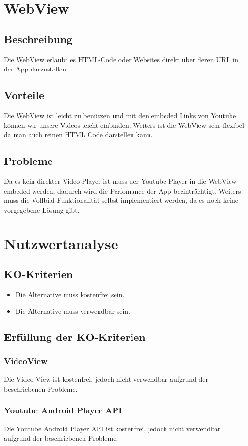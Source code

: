 \documentclass[article,10pt]{scrartcl}
\begin{document}
\section{WebView}
\subsection{Beschreibung}
Die WebView erlaubt es HTML-Code oder Websites direkt über deren URL in der App darzustellen.
\subsection{Vorteile}
Die WebView ist leicht zu benützen und mit den embeded Links von Youtube können wir unsere Videos leicht einbinden. Weiters ist die WebView sehr flexibel da man auch reinen HTML Code darstellen kann.
\subsection{Probleme}
Da es kein direkter Video-Player ist muss der Youtube-Player in die WebView embeded werden, dadurch wird die Perfomance der App beeinträchtigt. Weiters muss die Vollbild Funktionalität selbst implementiert werden, da es noch keine vorgegebene Lösung gibt.


\section{Nutzwertanalyse}
\subsection{KO-Kriterien}
\begin{itemize}
\item Die Alternative muss kostenfrei sein.
\item Die Alternative muss verwendbar sein.
\end{itemize}
\subsection{Erfüllung der KO-Kriterien}
\subsubsection{VideoView}
Die Video View ist kostenfrei, jedoch nicht verwendbar aufgrund der beschriebenen Probleme.
\subsubsection{Youtube Android Player API}
Die Youtube Android Player API ist kostenfrei, jedoch nicht verwendbar aufgrund der beschriebenen Probleme.
\end{document}
